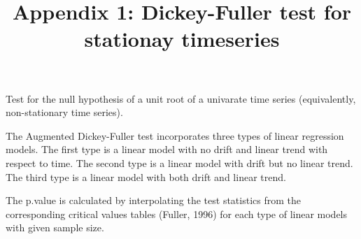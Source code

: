 \documentclass[
]{article}
\title{Appendix 1: Dickey-Fuller test for stationay timeseries}
\author{}
\date{\vspace{-2.5em}}
\begin{document}
\maketitle

Test for the null hypothesis of a unit root of a univarate time series (equivalently, non-stationary time series).

The Augmented Dickey-Fuller test incorporates three types of linear regression models. The first type is a linear model with no drift and linear trend with respect to time. The second type is a linear model with drift but no linear trend. The third type is a linear model with both drift and linear trend.

The p.value is calculated by interpolating the test statistics from the corresponding critical values tables (Fuller, 1996) for each type of linear models with given sample size.

\newpage
\end{document}
